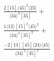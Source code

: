 \documentclass[varwidth, border=5pt]{standalone}
\begin{document}
\begin{my}
$\begin{gathered}
\scriptscriptstyle\frac{2[15]⟨45⟩^2⟨23⟩}{⟨34⟩^4[35]}+\\
\scriptscriptstyle\frac{1⟨12⟩[15]^2⟨45⟩^2}{⟨34⟩^4[35]^2}+\\
\scriptscriptstyle\frac{-2[13][45]⟨24⟩⟨45⟩}{⟨34⟩^3[35]^2}\phantom{+}
\end{gathered}$
\end{my}
\end{document}
